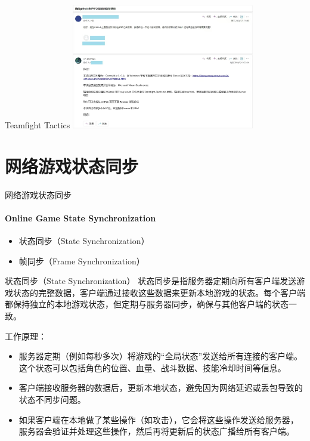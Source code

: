 \documentclass{beamer}
\begin{document}

\begin{frame}[fragile]{Teamfight Tactics}
\includegraphics[width=0.6\textwidth]
{figures/email_3}
\end{frame}


\section{网络游戏状态同步}


\begin{chapter}{}{网络游戏状态同步}
\framesubtitle{Online Game State Synchronization}
\begin{itemize}
\item 状态同步（State Synchronization）
\item 帧同步（Frame Synchronization）
\end{itemize}
\end{chapter}


\begin{frame}[fragile]{状态同步（State Synchronization）}
状态同步是指服务器定期向所有客户端发送游戏状态的完整数据，客户端通过接收这些数据来更新本地游戏的状态。每个客户端都保持独立的本地游戏状态，但定期与服务器同步，确保与其他客户端的状态一致。

\vspace{1em}

工作原理：
\begin{itemize}
\item 服务器定期（例如每秒多次）将游戏的“全局状态”发送给所有连接的客户端。这个状态可以包括角色的位置、血量、战斗数据、技能冷却时间等信息。
\item 客户端接收服务器的数据后，更新本地状态，避免因为网络延迟或丢包导致的状态不同步问题。
\item 如果客户端在本地做了某些操作（如攻击），它会将这些操作发送给服务器，服务器会验证并处理这些操作，然后再将更新后的状态广播给所有客户端。
\end{itemize}
\end{frame}
\end{document}
